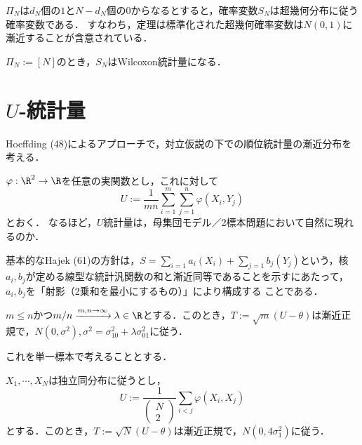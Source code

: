 \documentclass[uplatex,dvipdfmx]{jsreport}
\begin{document}
\begin{example}
    $\Pi_N$は$d_N$個の$1$と$N-d_N$個の$0$からなるとすると，確率変数$S_N$は超幾何分布に従う確率変数である．
    すなわち，定理は標準化された超幾何確率変数は$N(0,1)$に漸近することが含意されている．
\end{example}

\begin{example}
    $\Pi_N:=[N]$のとき，$S_N$はWilcoxon統計量になる．
\end{example}

\section{$U$-統計量}

\begin{tcolorbox}[colframe=ForestGreen, colback=ForestGreen!10!white,breakable,colbacktitle=ForestGreen!40!white,coltitle=black,fonttitle=\bfseries\sffamily,
title=]
    Hoeffding (48)によるアプローチで，対立仮説の下での順位統計量の漸近分布を考える．
\end{tcolorbox}

\begin{notation}
    $\varphi:\R^2\to\R$を任意の実関数とし，これに対して
    \[U:=\frac{1}{mn}\sum^m_{i=1}\sum^n_{j=1}\varphi(X_i,Y_j)\]
    とおく．
    なるほど，$U$統計量は，母集団モデル／2標本問題において自然に現れるのか．
\end{notation}

\begin{remarks}
    基本的なHajek (61)の方針は，$S=\sum_{i=1}a_i(X_i)+\sum_{j=1}b_j(Y_j)$という，核$a_i,b_j$が定める線型な統計汎関数の和と漸近同等であることを示すにあたって，$a_i,b_j$を「射影（2乗和を最小にするもの）」により構成する
    ことである．
\end{remarks}

\begin{theorem}
    $m\le n$かつ$m/n\xrightarrow{m,n\to\infty}\lambda\in\R$とする．このとき，$T:=\sqrt{m}(U-\theta)$は漸近正規で，$N(0,\sigma^2),\sigma^2=\sigma_{10}^2+\lambda\sigma_{01}^2$に従う．
\end{theorem}

これを単一標本で考えることとする．

\begin{theorem}
    $X_1,\cdots,X_N$は独立同分布に従うとし，
    \[U:=\frac{1}{\begin{pmatrix}N\\2\end{pmatrix}}\sum_{i<j}\varphi(X_i,X_j)\]
    とする．このとき，$T:=\sqrt{N}(U-\theta)$は漸近正規で，$N(0,4\sigma_1^2)$に従う．
\end{theorem}
\end{document}
